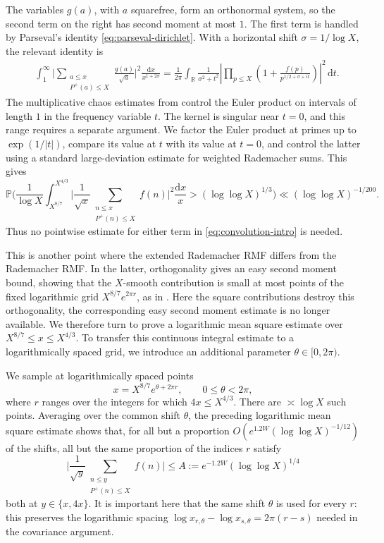 \documentclass[a4paper,12pt,reqno]{amsart}
\numberwithin{equation}{section}
\theoremstyle{remark}
\begin{document}
The variables \(g(a)\), with \(a\) squarefree, form an orthonormal system,
so the second term on the right has second moment at most \(1\). The first
term is handled by Parseval's identity \eqref{eq:parseval-dirichlet}. With a horizontal shift
\(\sigma=1/\log X\), the relevant identity is
\[
\begin{aligned}
 &\int_1^\infty
 \Bigg|
 \sum_{\substack{a\leq x\\P^+(a)\leq X}}
 \frac{g(a)}{\sqrt a}
 \Bigg|^2
 \frac{\mathrm dx}{x^{1+2\sigma}} =
 \frac{1}{2\pi}\int_{\mathbb R}
 \frac{1}{\sigma^2+t^2}
 \left|
 \displaystyle\prod_{p\leq X}
 \left(1+\frac{f(p)}
 {p^{1/2+\sigma+it}}\right)
 \right|^2
 \,\mathrm dt .
\end{aligned}
\]
The multiplicative chaos estimates from
\cite{Harper2020Low,Harper2023Large} control the Euler product  on intervals
of length \(1\) in the frequency variable \(t\). The kernel is singular near \(t=0\), and
this range requires a separate argument. We factor the Euler product at primes up to \(\exp(1/|t|)\), compare its
value at \(t\) with its value at \(t=0\), and control the latter using a
standard large-deviation estimate for weighted Rademacher sums.
This gives
\[
 \mathbb P\Bigg(
 \frac{1}{\log X}
 \int_{X^{8/7}}^{X^{4/3}}
 \Bigg|
 \frac{1}{\sqrt x}
 \sum_{\substack{n\leq x\\P^+(n)\leq X}}f(n)
 \Bigg|^2\frac{\mathrm dx}{x}
 >
 (\log\log X)^{1/3}
 \Bigg)
 \ll(\log\log X)^{-1/200}.
\]
Thus no pointwise estimate for either term in
\eqref{eq:convolution-intro} is needed.

This is another point where the extended Rademacher RMF differs
from the Rademacher RMF.  In the latter, orthogonality gives
an easy second moment bound, showing that the \(X\)-smooth contribution is small at most points of the fixed logarithmic grid $X^{8/7}e^{2\pi r}$, as in \cite[Section~3.1]{Harper2023Large}.  Here the square contributions destroy this orthogonality, the corresponding easy second moment estimate is no longer available. We therefore turn to prove a logarithmic mean square estimate over \(X^{8/7}\le x\le X^{4/3}\).  To transfer this continuous integral estimate to a logarithmically
spaced grid, we introduce an additional  parameter \(\theta \in[0, 2\pi) \). 


We sample at logarithmically spaced points
\[
 x=X^{8/7}e^{\theta+2\pi r},
 \qquad 0\leq\theta<2\pi,
\]
where \(r\) ranges over the integers for which \(4x\leq X^{4/3}\).
There are \(\asymp\log X\) such points.
Averaging over the common
shift \(\theta\), the preceding logarithmic mean square estimate shows that,
for all but a proportion
$
 O\!\left(e^{1.2W}(\log\log X)^{-1/12}\right)
$
of the shifts, all but the same proportion of the indices \(r\) satisfy
\[
 \Bigg|
 \frac{1}{\sqrt y}
 \sum_{\substack{n\leq y\\P^+(n)\leq X}}f(n)
 \Bigg|
 \leq {A}:=e^{-1.2W}(\log\log X)^{1/4}
\]
both at $y\in\{x,4x\}$. It is important here that the same shift $\theta$  is used for every $r$: this preserves the logarithmic spacing $\log x_{r,\theta}-\log x_{s,\theta}=2\pi(r-s)$
needed in the covariance argument.
\end{document}
